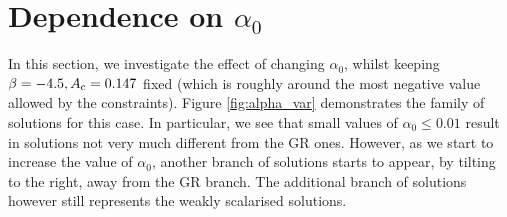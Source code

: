 \documentclass[12pt]{article}
\numberwithin{equation}{section}
\begin{document}
\section{Dependence on $\alpha_0$} 
\label{sec:massless_sols_alpha0}
In this section, we investigate the effect of changing $\alpha_0$, whilst keeping $\beta = -4.5, A_{\rm c} = 0.147$ fixed (which is roughly around the most negative value allowed by the constraints). Figure \ref{fig:alpha_var} demonstrates the family of solutions for this case. In particular, we see that small values of $\alpha_0 \leq 0.01$ result in solutions not very much different from the GR ones. However, as we start to increase the value of $\alpha_0$, another branch of solutions starts to appear, by tilting to the right, away from the GR branch. The additional branch of solutions however still represents the weakly scalarised solutions.
\end{document}
